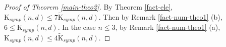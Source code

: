 \documentclass[10pt]{amsart}
\theoremstyle{remark}
\begin{document}

\begin{proof}[Proof of Theorem \ref{main-theo2}]
By Theorem \ref{fact-ele}, $\mathrm{K}_{symp}(n,d) \leq 7 \tilde{\mathrm{K}}_{symp}(n,d)$. 
Then by Remark \ref{fact-num-theo1} (b), $6 \leq \mathrm{K}_{symp}(n,d)$.
In the case $n \leq 3$, by Remark \ref{fact-num-theo1} (a), $\mathrm{K}_{symp}(n,d) \leq 4\tilde{\mathrm{K}}_{symp}(n,d)$. 
\end{proof}
\end{document}
